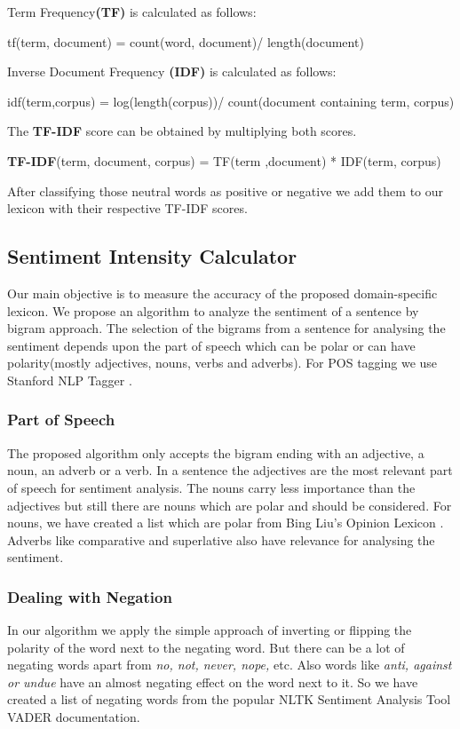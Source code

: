 \documentclass[conference]{IEEEtran}
\begin{document}
Term Frequency\textbf{(TF)} is calculated as follows:

tf(term, document) = count(word, document)/ length(document)


Inverse Document Frequency \textbf{(IDF)} is calculated as follows:

idf(term,corpus) = log(length(corpus))/ 	count(document containing term, corpus)


The \textbf{TF-IDF} score can be obtained by multiplying both scores. 

\textbf{TF-IDF}(term, document, corpus) = TF(term ,document)
* IDF(term, corpus)

After classifying those neutral words as positive or negative we add them to our lexicon with their respective TF-IDF scores.

\subsection{Sentiment Intensity Calculator}
Our main objective is to measure the accuracy of the proposed domain-specific lexicon. We propose an algorithm to analyze the sentiment of a sentence by bigram approach. The selection of the bigrams from a sentence for analysing the sentiment depends upon the part of speech which can be polar or can have polarity(mostly adjectives, nouns, verbs and adverbs). For POS tagging we use Stanford NLP Tagger \cite{c13}.
\subsubsection{Part of Speech}
The proposed algorithm only accepts the bigram ending with an adjective, a noun, an adverb or a verb.
In a sentence the adjectives are the most relevant part of speech for sentiment analysis. The nouns carry less importance than the adjectives but still there are nouns which are polar and should be considered. For nouns, we have created a list which are polar from Bing Liu's Opinion Lexicon \cite{c14,c15}. Adverbs like comparative and superlative also have relevance for analysing the sentiment. 
\subsubsection{Dealing with Negation}In our algorithm we apply the simple approach of inverting or flipping the polarity of the word next to the negating word. But there can be a lot of negating words apart from \textit{no, not, never, nope, }etc. Also words like \textit{anti, against or undue} have an almost negating effect on the word next to it. So we have created a list of negating words from the popular NLTK Sentiment Analysis Tool VADER \cite{c16} documentation.
\end{document}
